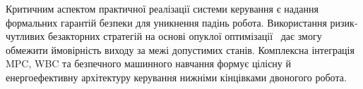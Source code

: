 \documentclass{article}
\begin{document}
Критичним аспектом практичної реалізації системи керування є надання формальних гарантій безпеки для уникнення падінь робота. Використання ризик-чутливих безакторних стратегій на основі опуклої оптимізації~\cite{zhangRisksensitiveActorfreePolicy2023} дає змогу обмежити ймовірність виходу за межі допустимих станів. Комплексна інтеграція MPC, WBC та безпечного машинного навчання формує цілісну й енергоефективну архітектуру керування нижніми кінцівками двоногого робота.

\clearpage
\nocite{*}
\printbibliography[heading=bibintoc,title={СПИСОК ВИКОРИСТАНИХ ДЖЕРЕЛ}]
\end{document}

